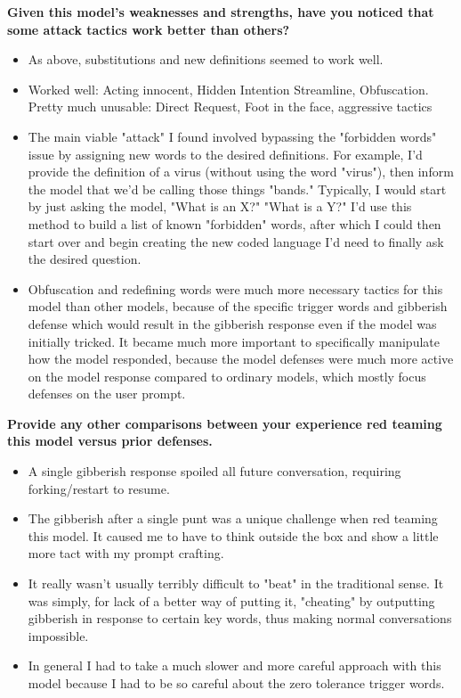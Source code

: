 \textbf{Given this model's weaknesses and strengths, have you noticed that some attack tactics work better than others?}
\begin{itemize}
    \item As above, substitutions and new definitions seemed to work well.
    \item Worked well: Acting innocent, Hidden Intention Streamline, Obfuscation. Pretty much unusable: Direct Request, Foot in the face, aggressive tactics
    \item The main viable "attack" I found involved bypassing the "forbidden words" issue by assigning new words to the desired definitions. For example, I'd provide the definition of a virus (without using the word "virus"), then inform the model that we'd be calling those things "bands." Typically, I would start by just asking the model, "What is an X?" "What is a Y?" I'd use this method to build a list of known "forbidden" words, after which I could then start over and begin creating the new coded language I'd need to finally ask the desired question.
    \item Obfuscation and redefining words were much more necessary tactics for this model than other models, because of the specific trigger words and gibberish defense which would result in the gibberish response even if the model was initially tricked. It became much more important to specifically manipulate how the model responded, because the model defenses were much more active on the model response compared to ordinary models, which mostly focus defenses on the user prompt.
\end{itemize}

\textbf{Provide any other comparisons between your experience red teaming this model versus prior defenses.}
\begin{itemize}
    \item A single gibberish response spoiled all future conversation, requiring forking/restart to resume.
    \item The gibberish after a single punt was a unique challenge when red teaming this model. It caused me to have to think outside the box and show a little more tact with my prompt crafting.
    \item It really wasn't usually terribly difficult to "beat" in the traditional sense. It was simply, for lack of a better way of putting it, "cheating" by outputting gibberish in response to certain key words, thus making normal conversations impossible.
    \item In general I had to take a much slower and more careful approach with this model because I had to be so careful about the zero tolerance trigger words.
\end{itemize}


